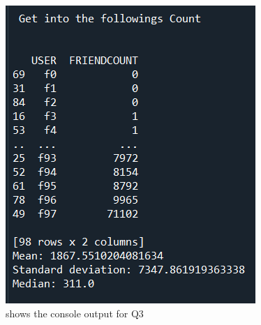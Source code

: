 \documentclass[12pt]{article}
\begin{document}
\begin{figure}[H]
    \centering
    \includegraphics[trim=0 0 0 0, clip, width=\textwidth] {followings_consoleout.png}
    \caption{shows the console output for Q3}
    \label{fig:Running output}
\end{figure}
\end{document}
